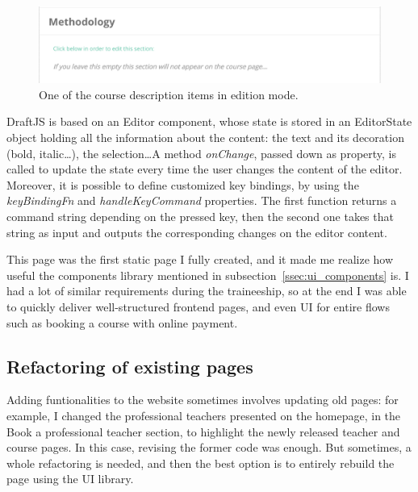 \begin{figure}[H]
    \centering
    \includegraphics[scale=0.4]{figure/courseEdit.png}
    \caption{One of the course description items in edition mode.}
    \label{fig:courseEdit}
\end{figure}

DraftJS is based on an \guillemotleft{} Editor \guillemotright{} component, whose state is stored in an \guillemotleft{} EditorState \guillemotright{} object holding all the information about the content: the text and its decoration (bold, italic\ldots), the selection\ldots A method \textit{onChange}, passed down as property, is called to update the state every time the user changes the content of the editor. Moreover, it is possible to define customized key bindings, by using the \textit{keyBindingFn} and \textit{handleKeyCommand} properties. The first function returns a command string depending on the pressed key, then the second one takes that string as input and outputs the corresponding changes on the editor content.

This page was the first static page I fully created, and it made me realize how useful the components library mentioned in {\sc subsection}~\ref{ssec:ui_components} is. I had a lot of similar requirements during the traineeship, so at the end I was able to quickly deliver well-structured frontend pages, and even UI for entire flows such as booking a course with online payment.

\subsection{Refactoring of existing pages}
\label{ssec:refactor}

Adding funtionalities to the website sometimes involves updating old pages: for example, I changed the professional teachers presented on the homepage, in the \guillemotleft{} Book a professional teacher \guillemotright{} section, to highlight the newly released teacher and course pages. In this case, revising the former code was enough. But sometimes, a whole refactoring is needed, and then the best option is to entirely rebuild the page using the UI library.


